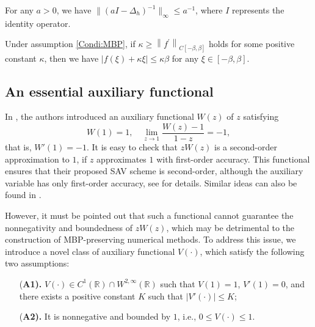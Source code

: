 \documentclass{m2an}
\begin{document}
\begin{lmm}\label{lem:MBP_left} 
	For any $ a > 0 $, we have $ \| ( a I - \Delta_{h} )^{-1} \|_{\infty} \leq a ^{-1} $, where $ I $ represents the identity operator.
\end{lmm}

\begin{lmm}\label{lem:MBP_right} 
	Under assumption \eqref{Condi:MBP}, if $\kappa \geq\left\|f^{\prime}\right\|_{C[-\beta, \beta]}$ holds for some positive constant $\kappa$, then we have $|f( \xi ) + \kappa \xi | \leq \kappa \beta$ for any $\xi \in[-\beta, \beta]$.
\end{lmm}

\subsection{An essential auxiliary functional}\label{subsec:AuxF}
In \cite{JSC_Qiao_2023}, the authors introduced an auxiliary functional $ W(z) $ of $ z $ satisfying
\begin{equation*}\label{AuxF_Hou}
	W (1) = 1, \quad \lim_{z\rightarrow1} \frac{ W (z) - 1 }{ 1 - z } = -1,
\end{equation*}
that is, $ W'(1) = -1 $. It is easy to check that $ z W(z) $ is a second-order approximation to $1$, if $ z $ approximates $ 1 $ with first-order accuracy. This functional ensures that their proposed SAV scheme is second-order, although the auxiliary variable has only first-order accuracy, see \cite{JSC_Qiao_2023} for details. Similar ideas can also be found in \cite{CMAME_Huang_2022,SISC_Huang_Shen_2020}.

However, it must be pointed out that such a functional cannot guarantee the nonnegativity and boundedness of $ z W(z) $, which may be detrimental to the construction of MBP-preserving numerical methods. To address this issue, we introduce a novel class of auxiliary functional $ V( \cdot ) $, which satisfy the following two assumptions:
\begin{itemize}
	\item[(\bf A1).]  $ V(\cdot) \in C^{1} ( \mathbb{R} ) \cap W^{2,\infty} ( \mathbb{R} )$ such that $ V(1) = 1 $, $ V'(1) = 0 $, and 
	there exists a positive constant $ K $ such that $ | V' ( \cdot ) | \leq K  $;
	\item[(\bf A2).] It is nonnegative and bounded by $1$, i.e., $ 0 \leq V( \cdot ) \leq 1  $.
\end{itemize}
\end{document}
